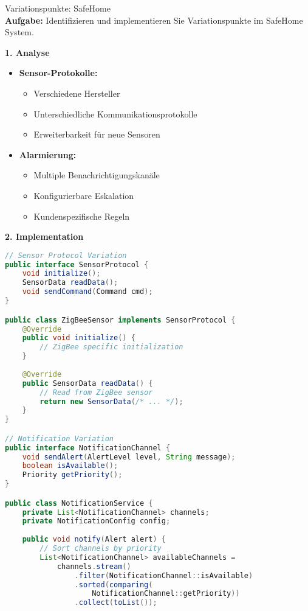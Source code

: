 \begin{example2}{Variationspunkte: SafeHome}\\
\textbf{Aufgabe:} Identifizieren und implementieren Sie Variationspunkte im SafeHome System.

\textbf{1. Analyse}
\begin{itemize}
    \item \textbf{Sensor-Protokolle:}
    \begin{itemize}
        \item Verschiedene Hersteller
        \item Unterschiedliche Kommunikationsprotokolle
        \item Erweiterbarkeit für neue Sensoren
    \end{itemize}
    
    \item \textbf{Alarmierung:}
    \begin{itemize}
        \item Multiple Benachrichtigungskanäle
        \item Konfigurierbare Eskalation
        \item Kundenspezifische Regeln
    \end{itemize}
\end{itemize}

\textbf{2. Implementation}
\begin{lstlisting}[language=Java, style=basesmol]
// Sensor Protocol Variation
public interface SensorProtocol {
    void initialize();
    SensorData readData();
    void sendCommand(Command cmd);
}

public class ZigBeeSensor implements SensorProtocol {
    @Override
    public void initialize() {
        // ZigBee specific initialization
    }
    
    @Override
    public SensorData readData() {
        // Read from ZigBee sensor
        return new SensorData(/* ... */);
    }
}

// Notification Variation
public interface NotificationChannel {
    void sendAlert(AlertLevel level, String message);
    boolean isAvailable();
    Priority getPriority();
}

public class NotificationService {
    private List<NotificationChannel> channels;
    private NotificationConfig config;
    
    public void notify(Alert alert) {
        // Sort channels by priority
        List<NotificationChannel> availableChannels = 
            channels.stream()
                .filter(NotificationChannel::isAvailable)
                .sorted(comparing(
                    NotificationChannel::getPriority))
                .collect(toList());
                

\end{lstlisting}
\end{example2}
